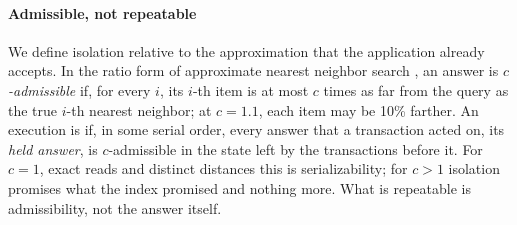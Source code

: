 \documentclass[sigconf, nonacm, review]{acmart}
\begin{document}
\paragraph{Admissible, not repeatable}
We define isolation relative to the approximation that the application
already accepts. In the ratio form of approximate nearest neighbor
search \cite{DBLP:conf/stoc/IndykM98}, an answer is
\emph{$c$-admissible} if, for every $i$, its $i$-th item is at most $c$
times as far from the query as the true $i$-th nearest neighbor; at
$c=1.1$, each item may be 10\% farther. An execution is
\emph{\cser{}} if, in some serial order, every answer that a
transaction acted on, its \emph{held answer}, is $c$-admissible in the
state left by the transactions before it. For $c=1$, exact reads and distinct distances
this is serializability; for $c>1$ isolation promises what the index
promised and nothing more. What is repeatable is admissibility, not
the answer itself.
\end{document}
